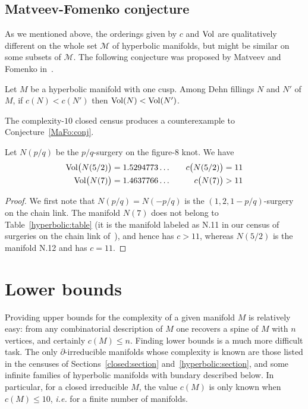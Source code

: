 \documentclass[10pt]{article}      %
\newcommand{\calM} {\ensuremath {\mathcal{M}}}
\newcommand{\Vol}{{\rm Vol}}
\begin{document}
\subsection{Matveev-Fomenko conjecture} \label{counterexample:subsection}
As we mentioned above, the orderings given by $c$ and $\Vol$ are qualitatively different
on the whole set $\calM$ of hyperbolic manifolds, but might be similar on some subsets
of $\calM$. The following conjecture was proposed by Matveev and Fomenko in~\cite{MaFo}.
\begin{conjecture} \label{MaFo:conj}
Let $M$ be a hyperbolic manifold with one cusp. 
Among Dehn fillings $N$ and $N'$ of $M$, if $c(N)<c(N')$ then
$\Vol(N)<\Vol(N')$.
\end{conjecture}
The complexity-$10$ closed census produces a counterexample to Conjecture~\ref{MaFo:conj}.
\begin{proposition}
Let $N(p/q)$ be the $p/q$-surgery on the figure-8 knot. We have
\begin{eqnarray*}
\Vol\big(N(5/2)\big) = 1.5294773\ldots & \quad & c\big(N(5/2)\big) = 11 \\
\Vol\big(N(7)\big) =   1.4637766\ldots & \quad & c\big(N(7)\big) > 11
\end{eqnarray*}
\end{proposition}
\begin{proof}
We first note that $N(p/q) = N(-p/q)$ is the $(1,2,1-p/q)$-surgery on the chain link.
The manifold $N(7)$ does not belong to Table~\ref{hyperbolic:table} (it is the manifold
labeled as N.11 in our census of surgeries on the chain link of~\cite{weblist}), and
hence has $c>11$, whereas $N(5/2)$ is the manifold N.12 and has $c=11$.
\end{proof}
 

\section{Lower bounds} \label{lower:bounds:section}
Providing upper bounds for the complexity of a given manifold $M$ is relatively easy:
from any combinatorial description of $M$ one recovers a spine of $M$ with $n$ 
vertices, and certainly $c(M)\leqslant n$. 
Finding lower bounds is a much more difficult task. 
The only $\partial$-irreducible
manifolds whose complexity is known are those listed in the censuses
of Sections~\ref{closed:section} and~\ref{hyperbolic:section}, and some infinite families
of hyperbolic manifolds with bundary described below.
In particular, for a closed irreducible $M$, the value
$c(M)$ is only known when $c(M)\leqslant 10$, \emph{i.e.} for a finite number of manifolds.
\end{document}
